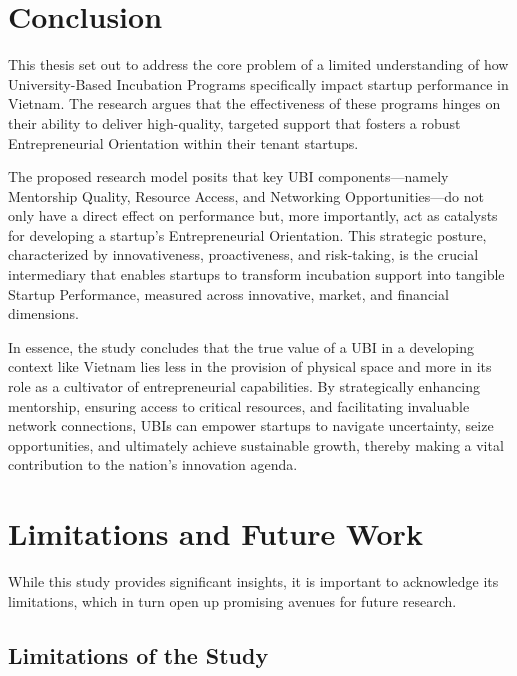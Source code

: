\documentclass[../Main.tex]{subfiles}
\begin{document}
	\section{Conclusion}
	
	This thesis set out to address the core problem of a limited understanding of how University-Based Incubation Programs specifically impact startup performance in Vietnam. The research argues that the effectiveness of these programs hinges on their ability to deliver high-quality, targeted support that fosters a robust Entrepreneurial Orientation within their tenant startups.
	
	The proposed research model posits that key UBI components—namely Mentorship Quality, Resource Access, and Networking Opportunities—do not only have a direct effect on performance but, more importantly, act as catalysts for developing a startup's Entrepreneurial Orientation. This strategic posture, characterized by innovativeness, proactiveness, and risk-taking, is the crucial intermediary that enables startups to transform incubation support into tangible Startup Performance, measured across innovative, market, and financial dimensions.
	
	In essence, the study concludes that the true value of a UBI in a developing context like Vietnam lies less in the provision of physical space and more in its role as a cultivator of entrepreneurial capabilities. By strategically enhancing mentorship, ensuring access to critical resources, and facilitating invaluable network connections, UBIs can empower startups to navigate uncertainty, seize opportunities, and ultimately achieve sustainable growth, thereby making a vital contribution to the nation's innovation agenda.
	
	\section{Limitations and Future Work}
	
	While this study provides significant insights, it is important to acknowledge its limitations, which in turn open up promising avenues for future research.
	
	\subsection{Limitations of the Study}
	
\end{document}
